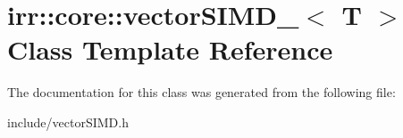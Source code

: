 \hypertarget{classirr_1_1core_1_1vectorSIMD__32}{}\section{irr\+:\+:core\+:\+:vector\+S\+I\+M\+D\+\_$<$ T $>$ Class Template Reference}
\label{classirr_1_1core_1_1vectorSIMD__32}


The documentation for this class was generated from the following file\+:\begin{DoxyCompactItemize}
\item 
include/vector\+S\+I\+M\+D.\+h\end{DoxyCompactItemize}
